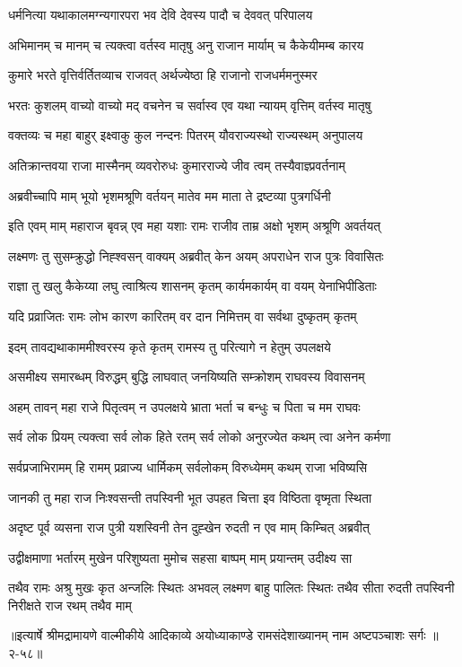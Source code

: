 \twolineshloka
{धर्मनित्या यथाकालमग्न्यगारपरा भव}
{देवि देवस्य पादौ च देववत् परिपालय} %

\twolineshloka
{अभिमानम् च मानम् च त्यक्त्वा वर्तस्व मातृषु}
{अनु राजान मार्याम् च कैकेयीमम्ब कारय} %

\twolineshloka
{कुमारे भरते वृत्तिर्वर्तितव्याच राजवत्}
{अर्थज्येष्ठा हि राजानो राजधर्ममनुस्मर} %

\twolineshloka
{भरतः कुशलम् वाच्यो वाच्यो मद् वचनेन च}
{सर्वास्व एव यथा न्यायम् वृत्तिम् वर्तस्व मातृषु} %

\twolineshloka
{वक्तव्यः च महा बाहुर् इक्ष्वाकु कुल नन्दनः}
{पितरम् यौवराज्यस्थो राज्यस्थम् अनुपालय} %

\twolineshloka
{अतिक्रान्तवया राजा मास्मैनम् व्यवरोरुधः}
{कुमारराज्ये जीव त्वम् तस्यैवाज्ञ्प्रवर्तनाम्} %

\twolineshloka
{अब्रवीच्चापि माम् भूयो भृशमश्रूणि वर्तयन्}
{मातेव मम माता ते द्रष्टव्या पुत्रगर्धिनी} %

\twolineshloka
{इति एवम् माम् महाराज बृवन्न् एव महा यशाः}
{रामः राजीव ताम्र अक्षो भृशम् अश्रूणि अवर्तयत्} %

\twolineshloka
{लक्ष्मणः तु सुसम्क्रुद्धो निह्श्वसन् वाक्यम् अब्रवीत्}
{केन अयम् अपराधेन राज पुत्रः विवासितः} %

\twolineshloka
{राज्ञा तु खलु कैकेय्या लघु त्वाश्रित्य शासनम्}
{कृतम् कार्यमकार्यम् वा वयम् येनाभिपीडिताः} %

\twolineshloka
{यदि प्रव्राजितः रामः लोभ कारण कारितम्}
{वर दान निमित्तम् वा सर्वथा दुष्कृतम् कृतम्} %

\twolineshloka
{इदम् तावद्यथाकाममीश्वरस्य कृते कृतम्}
{रामस्य तु परित्यागे न हेतुम् उपलक्षये} %

\twolineshloka
{असमीक्ष्य समारब्धम् विरुद्धम् बुद्धि लाघवात्}
{जनयिष्यति सम्क्रोशम् राघवस्य विवासनम्} %

\twolineshloka
{अहम् तावन् महा राजे पितृत्वम् न उपलक्षये}
{भ्राता भर्ता च बन्धुः च पिता च मम राघवः} %

\twolineshloka
{सर्व लोक प्रियम् त्यक्त्वा सर्व लोक हिते रतम्}
{सर्व लोको अनुरज्येत कथम् त्वा अनेन कर्मणा} %

\twolineshloka
{सर्वप्रजाभिरामम् हि रामम् प्रव्राज्य धार्मिकम्}
{सर्वलोकम् विरुध्येमम् कथम् राजा भविष्यसि} %

\twolineshloka
{जानकी तु महा राज निःश्वसन्ती तपस्विनी}
{भूत उपहत चित्ता इव विष्ठिता वृष्मृता स्थिता} %

\twolineshloka
{अदृष्ट पूर्व व्यसना राज पुत्री यशस्विनी}
{तेन दुह्खेन रुदती न एव माम् किम्चित् अब्रवीत्} %

\twolineshloka
{उद्वीक्षमाणा भर्तारम् मुखेन परिशुष्यता}
{मुमोच सहसा बाष्पम् माम् प्रयान्तम् उदीक्ष्य सा} %

\fourlineindentedshloka
{तथैव रामः अश्रु मुखः कृत अन्जलिः}
{स्थितः अभवल् लक्ष्मण बाहु पालितः स्थितः}
{तथैव सीता रुदती तपस्विनी}
{निरीक्षते राज रथम् तथैव माम्} %


॥इत्यार्षे श्रीमद्रामायणे वाल्मीकीये आदिकाव्ये अयोध्याकाण्डे रामसंदेशाख्यानम् नाम अष्टपञ्चाशः सर्गः ॥२-५८॥
